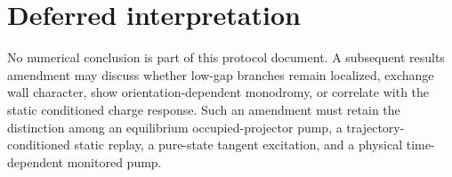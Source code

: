 \documentclass[aps,prb,twocolumn,floatfix,nofootinbib,superscriptaddress]{revtex4-2}
\begin{document}
\section{Deferred interpretation}

No numerical conclusion is part of this protocol document.  A subsequent
results amendment may discuss whether low-gap branches remain localized,
exchange wall character, show orientation-dependent monodromy, or correlate
with the static conditioned charge response.  Such an amendment must retain
the distinction among an equilibrium occupied-projector pump, a
trajectory-conditioned static replay, a pure-state tangent excitation, and a
physical time-dependent monitored pump.



\end{document}
